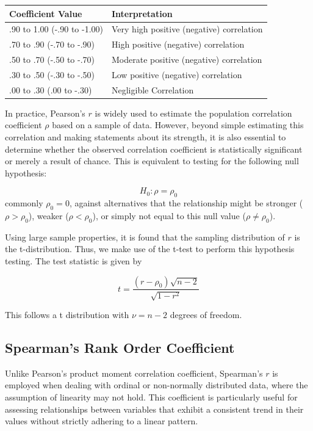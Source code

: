 \documentclass{article}
\begin{document}
\begin{table}[h]
\begin{tabular}{ll}
\hline
\textbf{Coefficient Value}  & \textbf{Interpretation}                   \\ \hline
.90 to 1.00 (-.90 to -1.00) & Very high positive (negative) correlation \\
.70 to .90 (-.70 to -.90)   & High positive (negative) correlation      \\
.50 to .70 (-.50 to -.70)   & Moderate positive (negative) correlation  \\
.30 to .50 (-.30 to -.50)   & Low positive (negative) correlation       \\
.00 to .30 (.00 to -.30)    & Negligible Correlation                    \\ \hline
\end{tabular}
\end{table}

In practice, Pearson's $r$ is widely used to estimate the population correlation coefficient $\rho$ based on a sample of data. However, beyond simple estimating this correlation and making statements about its strength, it is also essential to determine whether the observed correlation coefficient is statistically significant or merely a result of chance. This is equivalent to testing for the following null hypothesis:

$$
H_0: \rho = \rho_0
$$
commonly $\rho_0 = 0$, against alternatives that the relationship might be stronger ($\rho > \rho_0$), weaker ($\rho < \rho_0$), or simply not equal to this null value ($\rho \neq \rho_0$).

Using large sample properties, it is found that the sampling distribution of $r$ is the t-distribution. Thus, we make use of the t-test to perform this hypothesis testing. The test statistic is given by

$$
t = \frac{(r - \rho_0)\sqrt{n-2}}{\sqrt{1-r^2}}
$$

This follows a t distribution with $\nu = n-2$ degrees of freedom.

\subsection{Spearman's Rank Order Coefficient}

Unlike Pearson's product moment correlation coefficient, Spearman's $r$ is employed when dealing with ordinal or non-normally distributed data, where the assumption of linearity may not hold. This coefficient is particularly useful for assessing relationships between variables that exhibit a consistent trend in their values without strictly adhering to a linear pattern.
\end{document}
